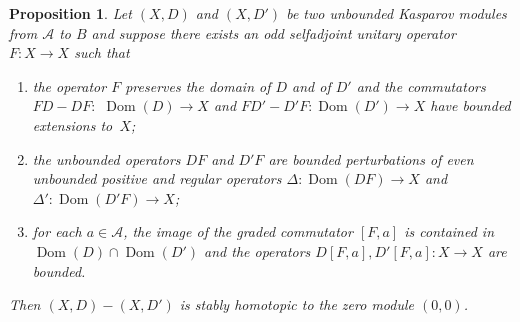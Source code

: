 \documentclass[11pt]{article}
\numberwithin{equation}{section}
\newtheorem{prop}[Theorem]{Proposition}
 { \theoremstyle{definition}
\newtheorem{dfn}[Theorem]{Definition}
\newtheorem{exa}[Theorem]{Example}
\newtheorem{rem}[Theorem]{Remark} }
\newcommand{\De}{\Delta}
\newcommand{\s}[1]{\mathscr{#1}}
\begin{document}
\begin{prop}\label{p:phaequ}
Let $(X,D)$ and $(X,D')$ be two unbounded Kasparov modules from $\s A$ to $B$ and suppose there exists an odd selfadjoint unitary operator $F\colon X \to X$ such that
\begin{enumerate}\itemsep=0pt
\item[$1)$] the operator $F$ preserves the domain of $D$ and of $D'$ and the commutators $F D - D F\colon$ $\operatorname{Dom}(D) \to X$ and $F D' - D' F\colon \operatorname{Dom}(D') \to X$ have bounded extensions to~$X$;
\item[$2)$] the unbounded operators $D F$ and $D' F$ are bounded perturbations of even unbounded positive and regular operators $\De\colon \operatorname{Dom}(DF) \to X$ and $\De'\colon \operatorname{Dom}(D'F) \to X$;
\item[$3)$] for each $a \in \s A$, the image of the graded commutator $[F,a]$ is contained in $\operatorname{Dom}(D) \cap \operatorname{Dom}(D')$ and the operators $D [F,a], D' [F,a]\colon X \to X$ are bounded.
\end{enumerate}
Then $(X,D) - (X,D')$ is stably homotopic to the zero module $(0,0)$.
\end{prop}
\end{document}
